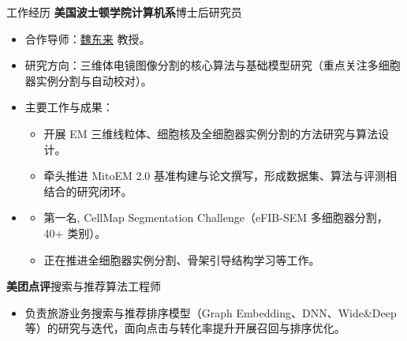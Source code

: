 \begin{rubric}{工作经历}
\entry*[2024年8月 -- 至今]%
		\textbf{美国波士顿学院计算机系}\hspace{3em}博士后研究员
 \vspace{-0.5em}
 \begin{itemize}
     \setlength{\itemsep}{0pt} \setlength{\parskip}{0pt}
     \item 合作导师：\href{https://donglaiw.github.io/}{魏东来} 教授。
     \item 研究方向：三维体电镜图像分割的核心算法与基础模型研究（重点关注多细胞器实例分割与自动校对）。
 \end{itemize}
\vspace{-1.5em}
\entry*[]
 \vspace{-1.5em}
 \begin{itemize}
     \setlength{\itemsep}{0pt} \setlength{\parskip}{0pt}
     \item 主要工作与成果：
     \begin{itemize}
         \setlength{\itemsep}{0pt} \setlength{\parskip}{0pt}
         \item 开展 EM 三维线粒体、细胞核及全细胞器实例分割的方法研究与算法设计。
         \item 牵头推进 MitoEM 2.0 基准构建与论文撰写，形成数据集、算法与评测相结合的研究闭环。
     \end{itemize}
 \end{itemize}
\vspace{-1.5em}
\entry*[]
 \vspace{-1.5em}
 \begin{itemize}
     \item[]
     \vspace{-1.5em}
     \begin{itemize}
         \setlength{\itemsep}{0pt} \setlength{\parskip}{0pt}
         \item 第一名, CellMap Segmentation Challenge（eFIB-SEM 多细胞器分割，40+ 类别）。
         \item 正在推进全细胞器实例分割、骨架引导结构学习等工作。
     \end{itemize}
 \end{itemize}
\entry*[2017年7月 -- 2019年7月]%
	\textbf{美团点评}\hspace{5em}搜索与推荐算法工程师
 \begin{itemize}
     \item 负责旅游业务搜索与推荐排序模型（Graph Embedding、DNN、Wide\&Deep 等）的研究与迭代，面向点击与转化率提升开展召回与排序优化。
 \end{itemize}

%
%
%
\end{rubric}
